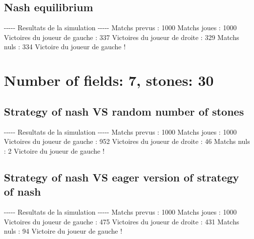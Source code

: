 \documentclass{article}%
\begin{document}
%
\subsection{Nash equilibrium}%
\label{subsec:Nash equilibrium}%
{-}{-}{-}{-}{-} Resultats de la simulation {-}{-}{-}{-}{-}\newline%
		\newline%
Matchs prevus : 1000\newline%
Matchs joues : 1000\newline%
\newline%
Victoires du joueur de gauche : 337\newline%
Victoires du joueur de droite : 329\newline%
Matchs nuls : 334\newline%
\newline%
Victoire du joueur de gauche !

%
\section{Number of fields: 7, stones: 30}%
\label{sec:Number of fields 7, stones 30}%
\subsection{Strategy of nash VS random number of stones}%
\label{subsec:Strategy of nash VS random number of stones}%
{-}{-}{-}{-}{-} Resultats de la simulation {-}{-}{-}{-}{-}\newline%
		\newline%
Matchs prevus : 1000\newline%
Matchs joues : 1000\newline%
\newline%
Victoires du joueur de gauche : 952\newline%
Victoires du joueur de droite : 46\newline%
Matchs nuls : 2\newline%
\newline%
Victoire du joueur de gauche !

%
\subsection{Strategy of nash VS eager version of strategy of nash}%
\label{subsec:Strategy of nash VS eager version of strategy of nash}%
{-}{-}{-}{-}{-} Resultats de la simulation {-}{-}{-}{-}{-}\newline%
		\newline%
Matchs prevus : 1000\newline%
Matchs joues : 1000\newline%
\newline%
Victoires du joueur de gauche : 475\newline%
Victoires du joueur de droite : 431\newline%
Matchs nuls : 94\newline%
\newline%
Victoire du joueur de gauche !
\end{document}
